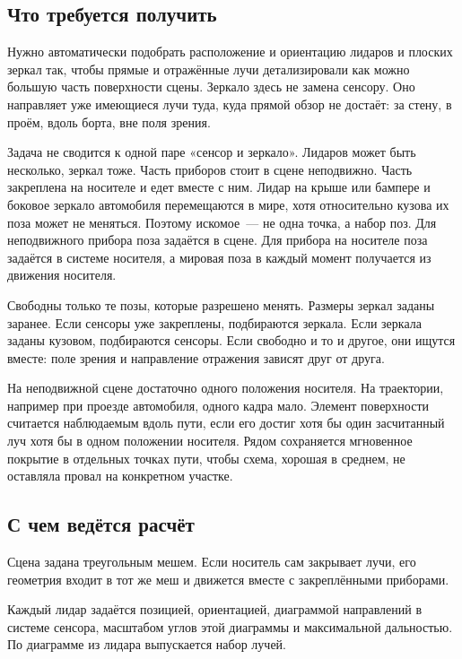 \documentclass{misisarticle}
\begin{document}
\subsection{Что требуется получить}

Нужно автоматически подобрать расположение и ориентацию лидаров и плоских зеркал так, чтобы прямые и отражённые лучи детализировали как можно большую часть поверхности сцены. Зеркало здесь не замена сенсору. Оно направляет уже имеющиеся лучи туда, куда прямой обзор не достаёт: за стену, в проём, вдоль борта, вне поля зрения.

Задача не сводится к одной паре «сенсор и зеркало». Лидаров может быть несколько, зеркал тоже. Часть приборов стоит в сцене неподвижно. Часть закреплена на носителе и едет вместе с ним. Лидар на крыше или бампере и боковое зеркало автомобиля перемещаются в мире, хотя относительно кузова их поза может не меняться. Поэтому искомое~--- не одна точка, а набор поз. Для неподвижного прибора поза задаётся в сцене. Для прибора на носителе поза задаётся в системе носителя, а мировая поза в каждый момент получается из движения носителя.

Свободны только те позы, которые разрешено менять. Размеры зеркал заданы заранее. Если сенсоры уже закреплены, подбираются зеркала. Если зеркала заданы кузовом, подбираются сенсоры. Если свободно и то и другое, они ищутся вместе: поле зрения и направление отражения зависят друг от друга.

На неподвижной сцене достаточно одного положения носителя. На траектории, например при проезде автомобиля, одного кадра мало. Элемент поверхности считается наблюдаемым вдоль пути, если его достиг хотя бы один засчитанный луч хотя бы в одном положении носителя. Рядом сохраняется мгновенное покрытие в отдельных точках пути, чтобы схема, хорошая в среднем, не оставляла провал на конкретном участке.

\subsection{С чем ведётся расчёт}

Сцена задана треугольным мешем. Если носитель сам закрывает лучи, его геометрия входит в тот же меш и движется вместе с закреплёнными приборами.

Каждый лидар задаётся позицией, ориентацией, диаграммой направлений в системе сенсора, масштабом углов этой диаграммы и максимальной дальностью. По диаграмме из лидара выпускается набор лучей.
\end{document}
